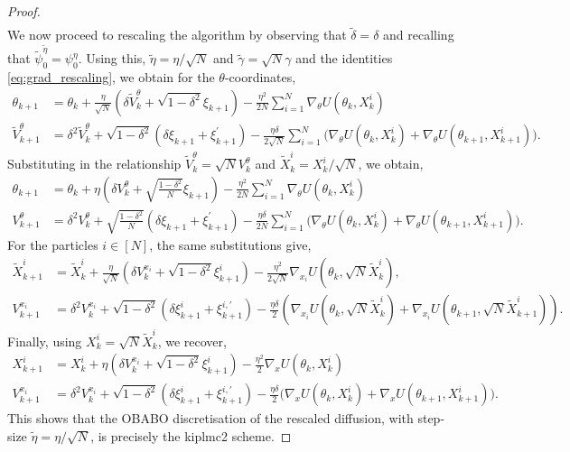 \begin{proof}
\begin{align*}
\end{align*}
\normalsize
We now proceed to rescaling the algorithm by observing that $\tilde{\delta}=\delta$ and recalling that $\tilde{\psi}_0^{\tilde{\eta}} = \psi_0^\eta$. Using this, $\tilde{\eta} = \eta/ \sqrt{N}$ and $\tilde{\gamma} = \sqrt{N}\gamma$ and the identities \eqref{eq:grad_rescaling}, we obtain for the $\theta$-coordinates,
\small
\begin{align*}
\theta_{k+1} &= \theta_k + \frac{\eta}{\sqrt{N}} \left(\delta \widetilde{V}^\theta_k + \sqrt{1-\delta^2}\xi_{k+1}\right) - \frac{\eta^2}{2N}\sum_{i=1}^N\nabla_\theta U(\theta_k, X_k^i)\\
\widetilde{V}^\theta_{k+1} &= \delta^2 \widetilde{V}^\theta_k  + \sqrt{1-\delta^2} (\delta\xi_{k+1} + \xi^\prime_{k+1})
- \frac{\eta\delta}{2\sqrt{N}}\sum_{i=1}^N \bigg(\nabla_\theta U(\theta_k, X_k^i) + \nabla_\theta U(\theta_{k+1}, X_{k+1}^i)\bigg).
\end{align*}
\normalsize
Substituting in the relationship $\widetilde{V}_k^\theta=\sqrt{N}V_k^\theta$ and $\widetilde{X}_k^i = X_k^i/\sqrt{N}$, we obtain,
\small
\begin{align*}
\theta_{k+1} &= \theta_k + \eta \left(\delta V^\theta_k + \sqrt{\frac{1-\delta^2}{N}}\xi_{k+1}\right)
- \frac{\eta^2}{2N}\sum_{i=1}^N\nabla_\theta U(\theta_k, X_k^i)\\
V^\theta_{k+1} &= \delta^2 V^\theta_k  + \sqrt{\frac{1-\delta^2}{N}} (\delta\xi_{k+1} + \xi^\prime_{k+1}) 
- \frac{\eta\delta}{2N}\sum_{i=1}^N \bigg(\nabla_\theta U(\theta_k, X_k^i) + \nabla_\theta U(\theta_{k+1}, X_{k+1}^i)\bigg).
\end{align*}
\normalsize
For the particles $i\in [N]$, the same substitutions give,
\small
\begin{align*}
\widetilde{X}^i_{k+1} &= \widetilde{X}^i_k + \frac{\eta}{\sqrt{N}}\left(\delta V^{x_i}_{k} + \sqrt{1-\delta^2} \xi^i_{k+1}\right) - \frac{\eta^2}{2\sqrt{N}} \nabla_{x_i} U(\theta_k , \sqrt{N}\widetilde{X}_k^i),\\
V^{x_i}_{k+1} &= \delta^2 V^{x_i}_k + \sqrt{1-\delta^2} (\delta \xi^i_{k+1} + \xi_{k+1}^{i,\prime}) - \frac{\eta\delta}{2} (\nabla_{x_i} U(\theta_k, \sqrt{N}\widetilde{X}^i_k)+ \nabla_{x_i} U(\theta_{k+1}, \sqrt{N}\widetilde{X}^i_{k+1})).
\end{align*}
\normalsize
Finally, using $X_k^i = \sqrt{N}\widetilde{X}_k^i$,
we recover,
\small
\begin{align*}
X^i_{k+1} &= X^i_k + \eta \left(\delta V^{x_i}_k + \sqrt{1-\delta^2}\xi^i_{k+1}\right)- \frac{\eta^2}{2}\nabla_x U(\theta_k, X_k^i)\\
V^{x_i}_{k+1} &= \delta^2 V^{x_i}_k  + \sqrt{1-\delta^2} (\delta\xi^i_{k+1} + \xi^{i,\prime}_{k+1}) - \frac{\eta\delta}{2} \bigg(\nabla_x U(\theta_k, X_k^i) + \nabla_x U(\theta_{k+1}, X_{k+1}^i)\bigg).
\end{align*}
\normalsize
This shows that the OBABO discretisation of the rescaled diffusion, with step-size $\tilde{\eta} = \eta/\sqrt{N}$, is precisely the \gls*{kiplmc2} scheme.
\end{proof}
